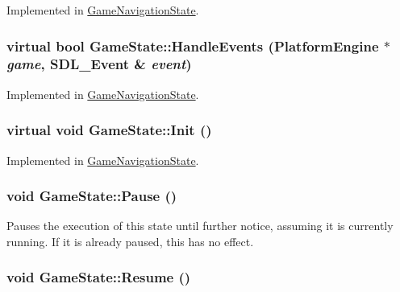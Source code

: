 Implemented in \hyperlink{class_game_navigation_state_a37dce070a906454c512192c067fda09}{GameNavigationState}.\hypertarget{class_game_state_de7bd9bda91253614322ca0ea77b7a14}{
\subsubsection[{HandleEvents}]{\setlength{\rightskip}{0pt plus 5cm}virtual bool GameState::HandleEvents ({\bf PlatformEngine} $\ast$ {\em game}, \/  SDL\_\-Event \& {\em event})}}
\label{dd/d87/class_game_state_de7bd9bda91253614322ca0ea77b7a14}




Implemented in \hyperlink{class_game_navigation_state_6e7c13d35a33478673c62ae55394cfdc}{GameNavigationState}.\hypertarget{class_game_state_eec488593bae214c0f738bd64dafba32}{
\subsubsection[{Init}]{\setlength{\rightskip}{0pt plus 5cm}virtual void GameState::Init ()}}
\label{dd/d87/class_game_state_eec488593bae214c0f738bd64dafba32}




Implemented in \hyperlink{class_game_navigation_state_8f613860bf544476ab9cff9fb7f98201}{GameNavigationState}.\hypertarget{class_game_state_0c47c6969a4e0bb32d6cdf7bf9376817}{
\subsubsection[{Pause}]{\setlength{\rightskip}{0pt plus 5cm}void GameState::Pause ()}}
\label{dd/d87/class_game_state_0c47c6969a4e0bb32d6cdf7bf9376817}


Pauses the execution of this state until further notice, assuming it is currently running. If it is already paused, this has no effect. \hypertarget{class_game_state_d12ece3c3fb066281b73b07a315f04e8}{
\subsubsection[{Resume}]{\setlength{\rightskip}{0pt plus 5cm}void GameState::Resume ()}}
\label{dd/d87/class_game_state_d12ece3c3fb066281b73b07a315f04e8}


